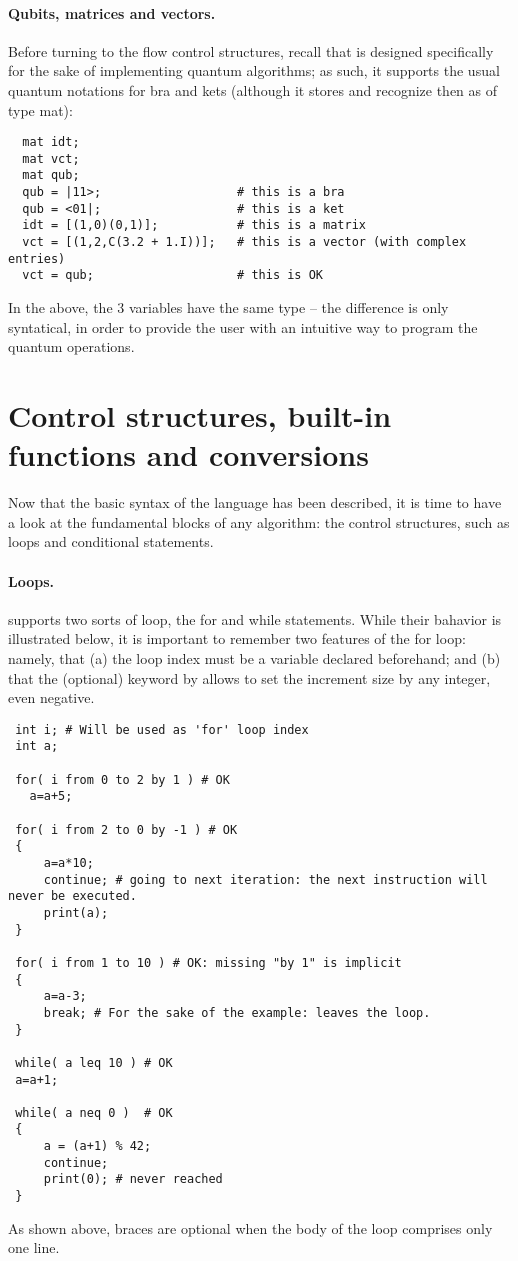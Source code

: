 \paragraph{Qubits, matrices and vectors.} Before turning to the flow control structures, recall that \QL is designed specifically for the sake of implementing quantum algorithms; as such, it supports the usual quantum notations for bra and kets (although it stores and recognize then as of type \textsf{mat}):
\begin{lstlisting}
  mat idt;
  mat vct;
  mat qub;
  qub = |11>;                   # this is a bra
  qub = <01|;                   # this is a ket
  idt = [(1,0)(0,1)];           # this is a matrix
  vct = [(1,2,C(3.2 + 1.I))];   # this is a vector (with complex entries)
  vct = qub;                    # this is OK
\end{lstlisting}
In the above, the 3 variables have the same type -- the difference is only syntatical, in order to provide the user with an intuitive way to program the quantum operations.


\section{Control structures, built-in functions and conversions}
Now that the basic syntax of the language has been described, it is time to have a look at the fundamental blocks of any algorithm: the control structures, such as loops and conditional statements. 

\paragraph{Loops.} \QL supports two sorts of loop, the \textsf{for} and \textsf{while} statements. While their bahavior is illustrated below, it is important to remember two features of the \textsf{for} loop: namely, that \textsf{(a)} the loop index must be a variable declared beforehand; and \textsf{(b)} that the (optional) keyword \textsf{by} allows to set the increment size by any integer, even negative.

\begin{lstlisting}
 int i; # Will be used as 'for' loop index
 int a;

 for( i from 0 to 2 by 1 ) # OK
   a=a+5;

 for( i from 2 to 0 by -1 ) # OK
 {
     a=a*10;
     continue; # going to next iteration: the next instruction will never be executed.
     print(a);
 }
 
 for( i from 1 to 10 ) # OK: missing "by 1" is implicit
 {
     a=a-3;
     break; # For the sake of the example: leaves the loop.
 }
 
 while( a leq 10 ) # OK
 a=a+1;
 
 while( a neq 0 )  # OK
 {
     a = (a+1) % 42;
     continue;
     print(0); # never reached
 }
\end{lstlisting}
As shown above, braces are optional when the body of the loop comprises only one line.

